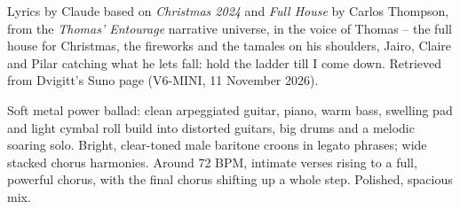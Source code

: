 
\label{sec:too-high-to-say}
\begin{notes}
Lyrics by Claude based on \emph{Christmas 2024} and \emph{Full House} by Carlos Thompson, from the \emph{Thomas' Entourage} narrative universe, in the voice of Thomas -- the full house for Christmas, the fireworks and the tamales on his shoulders, Jairo, Claire and Pilar catching what he lets fall: hold the ladder till I come down. Retrieved from Dvigitt's Suno page (V6-MINI, 11 November 2026).
\end{notes}
\begin{style}
Soft metal power ballad: clean arpeggiated guitar, piano, warm bass, swelling pad and light cymbal roll build into distorted guitars, big drums and a melodic soaring solo. Bright, clear-toned male baritone croons in legato phrases; wide stacked chorus harmonies. Around 72 BPM, intimate verses rising to a full, powerful chorus, with the final chorus shifting up a whole step. Polished, spacious mix.
\end{style}
